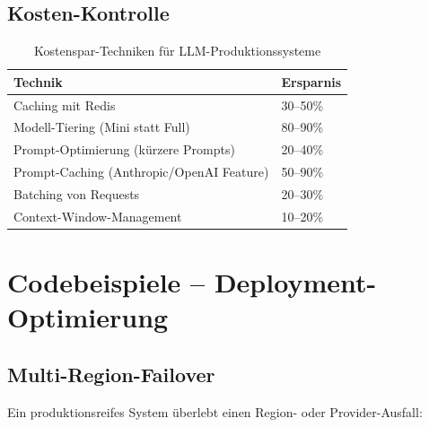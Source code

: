 \subsection{Kosten-Kontrolle}

\begin{table}[H]
\centering
\begin{tabularx}{\linewidth}{lX}
\toprule
\textbf{Technik} & \textbf{Ersparnis} \\
\midrule
Caching mit Redis & 30--50\% \\
Modell-Tiering (Mini statt Full) & 80--90\% \\
Prompt-Optimierung (kürzere Prompts) & 20--40\% \\
Prompt-Caching (Anthropic/OpenAI Feature) & 50--90\% \\
Batching von Requests & 20--30\% \\
Context-Window-Management & 10--20\% \\
\bottomrule
\end{tabularx}
\caption{Kostenspar-Techniken für LLM-Produktionssysteme}
\end{table}

\section{Codebeispiele -- Deployment-Optimierung}

\subsection{Multi-Region-Failover}

Ein produktionsreifes System überlebt einen Region- oder Provider-Ausfall:

